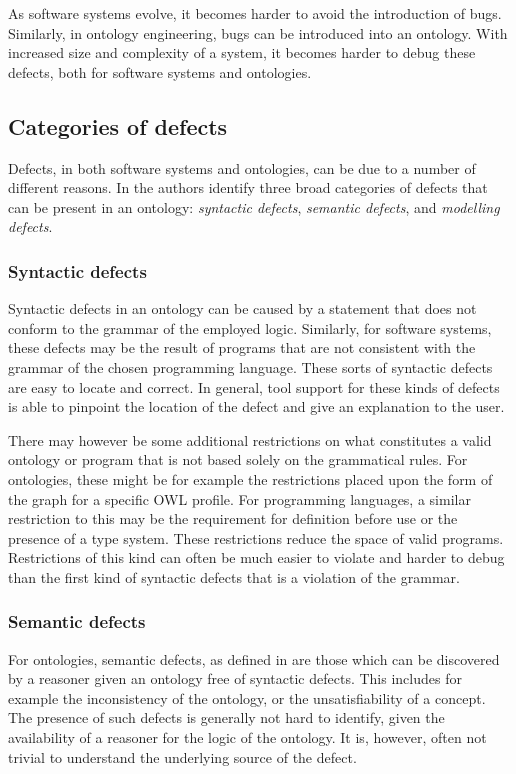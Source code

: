 
As software systems evolve, it becomes harder to avoid the introduction of bugs. Similarly, in ontology engineering, bugs can be introduced into an ontology. With increased size and complexity of a system, it becomes harder to debug these defects, both for software systems and ontologies.

\subsection{Categories of defects}

Defects, in both software systems and ontologies, can be due to a number of different reasons. In \cite{kalyanpur2005debugging} the authors identify three broad categories of defects that can be present in an ontology: \emph{syntactic defects}, \emph{semantic defects}, and \emph{modelling defects}.

\subsubsection{Syntactic defects}

Syntactic defects in an ontology can be caused by a statement that does not conform to the grammar of the employed logic. Similarly, for software systems, these defects may be the result of programs that are not consistent with the grammar of the chosen programming language. These sorts of syntactic defects are easy to locate and correct. In general, tool support for these kinds of defects is able to pinpoint the location of the defect and give an explanation to the user.

There may however be some additional restrictions on what constitutes a valid ontology or program that is not based solely on the grammatical rules. For ontologies, these might be for example the restrictions placed upon the form of the graph for a specific OWL profile. For programming languages, a similar restriction to this may be the requirement for definition before use or the presence of a type system. These restrictions reduce the space of valid programs. Restrictions of this kind can often be much easier to violate and harder to debug than the first kind of syntactic defects that is a violation of the grammar.

\subsubsection{Semantic defects}\label{semantic-defects}

For ontologies, semantic defects, as defined in \cite{kalyanpur2005debugging} are those which can be discovered by a reasoner given an ontology free of syntactic defects. This includes for example the inconsistency of the ontology, or the unsatisfiability of a concept. The presence of such defects is generally not hard to identify, given the availability of a reasoner for the logic of the ontology. It is, however, often not trivial to understand the underlying source of the defect.

